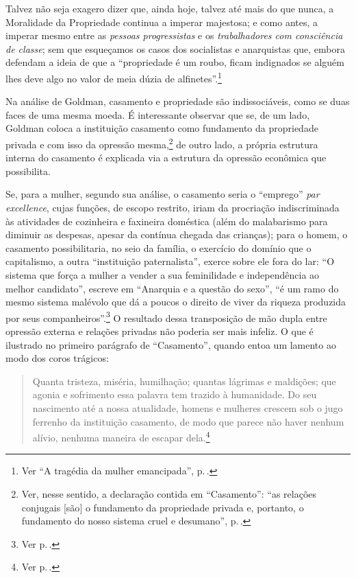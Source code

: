Talvez não seja exagero
dizer que, ainda hoje, talvez até mais do que nunca, a Moralidade da
Propriedade continua a imperar majestosa; e como antes, a imperar mesmo
entre as \textit{pessoas progressistas} e os \textit{trabalhadores com consciência
de classe}; sem que esqueçamos os casos dos socialistas e anarquistas
que, embora defendam a ideia de que a ``propriedade é um roubo, ficam indignados se
alguém lhes deve algo no valor de meia dúzia de alfinetes''.\footnote{Ver ``A tragédia da mulher emancipada'', p.\,\pageref{alfinete}.}

Na análise de Goldman, casamento e propriedade são indissociáveis, como
se duas faces de uma mesma moeda. É interessante observar que se,
de um lado, Goldman coloca a instituição casamento como
fundamento da propriedade privada e com isso da opressão mesma,\footnote{Ver,
nesse sentido, a declaração contida em ``Casamento'': ``as relações
conjugais {[}são{]} o fundamento da propriedade privada e, portanto, o
fundamento do nosso sistema cruel e desumano'', p.\,\pageref{cruel}.} de outro lado,
a própria estrutura interna do casamento é explicada via a estrutura da
opressão econômica que possibilita.

Se, para a mulher, segundo sua
análise, o casamento seria o ``emprego'' \emph{par excellence}, cujas
funções, de escopo restrito, iriam da procriação indiscriminada
às atividades de cozinheira e faxineira doméstica (além do
malabarismo para diminuir as despesas, apesar da contínua chegada das
crianças); para o homem, o casamento possibilitaria, no seio da família,
o exercício do domínio que o capitalismo, a outra ``instituição
paternalista'', exerce sobre ele fora do lar: ``O sistema que
força a mulher a vender a sua feminilidade e independência ao melhor
candidato'', escreve em ``Anarquia e a questão do sexo'', ``é um ramo do
mesmo sistema malévolo que dá a poucos o direito de viver da riqueza
produzida por seus companheiros''.\footnote{Ver p.\,\pageref{sistema}.} O resultado dessa transposição de mão
dupla entre opressão externa e relações privadas não poderia ser mais
infeliz. O que é ilustrado no primeiro parágrafo de ``Casamento'',
quando entoa um lamento ao modo dos coros trágicos:

\begin{quote}
Quanta tristeza, miséria, humilhação; quantas lágrimas e maldições; que
agonia e sofrimento essa palavra tem trazido à humanidade. Do seu
nascimento até a nossa atualidade, homens e mulheres crescem sob o jugo
ferrenho da instituição casamento, de modo que parece não haver nenhum
alívio, nenhuma maneira de escapar dela.\footnote{Ver p.\,\pageref{casamento}.}
\end{quote}

